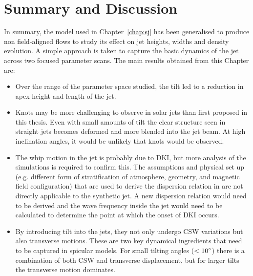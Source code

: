 \section{Summary and Discussion}
\label{sec:sum}
In summary, the model used in Chapter~\ref{chap:sj} has been generalised to produce non field-aligned flows to study its effect on jet heights, widths and density evolution. A simple approach is taken to capture the basic dynamics of the jet across two focused parameter scans. The main results obtained from this Chapter are:   
\begin{itemize}
\item Over the range of the parameter space studied, the tilt led to a reduction in apex height and length of the jet.
\item Knots may be more challenging to observe in solar jets than first proposed in this thesis. Even with small amounts of tilt the clear structure seen in straight jets becomes deformed and more blended into the jet beam. At high inclination angles, it would be unlikely that knots would be observed. 
\item The whip motion in the jet is probably due to DKI, but more analysis of the simulations is required to confirm this. The assumptions and physical set up (e.g. different form of stratification of atmosphere, geometry, and magnetic field configuration) that are used to derive the dispersion relation in \cite{Zaqarashvili2020ApJ893L46Z} are not directly applicable to the synthetic jet. A new dispersion relation would need to be derived and the wave frequency inside the jet would need to be calculated to determine the point at which the onset of DKI occurs. 
\item By introducing tilt into the jets, they not only undergo CSW variations but also transverse motions. These are two key dynamical ingredients that need to be captured in spicular models. For small tilting angles ($<10^{\circ}$) there is a combination of both CSW and transverse displacement, but for larger tilts the transverse motion dominates.
\end{itemize}
